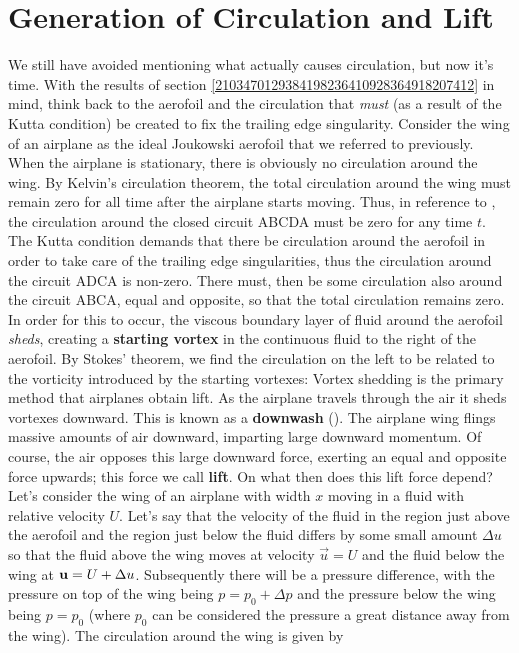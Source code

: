 \documentclass[12pt]{book}
\begin{document}
\section{Generation of Circulation and Lift}
We still have avoided mentioning what actually causes circulation, but now it's time.  With the results of section \ref{2103470129384198236410928364918207412} in mind, think back to the aerofoil and the circulation that \textit{must} (as a result of the Kutta condition) be created to fix the trailing edge singularity.  Consider the wing of an airplane as the ideal Joukowski aerofoil that we referred to previously.  When the airplane is stationary, there is obviously no circulation around the wing.  By Kelvin's circulation theorem, the total circulation around the wing must remain zero for all time after the airplane starts moving.  Thus, in reference to , the circulation around the closed circuit ABCDA must be zero for any time $t$.  The Kutta condition demands that there be circulation around the aerofoil in order to take care of the trailing edge singularities, thus the circulation around the circuit ADCA is non-zero.  There must, then be some circulation also around the circuit ABCA, equal and opposite, so that the total circulation remains zero.  In order for this to occur, the viscous boundary layer of fluid around the aerofoil \textit{sheds}, creating a \textbf{starting vortex} in the continuous fluid to the right of the aerofoil.  By Stokes' theorem, we find the circulation on the left to be related to the vorticity introduced by the starting vortexes:
Vortex shedding is the primary method that airplanes obtain lift.  As the airplane travels through the air it sheds vortexes downward. This is known as a \textbf{downwash} ().  The airplane wing flings massive amounts of air downward, imparting large downward momentum.  Of course, the air opposes this large downward force, exerting an equal and opposite force upwards; this force we call \textbf{lift}.  On what then does this lift force depend?  Let's consider the wing of an airplane with width $x$ moving in a fluid with relative velocity $U$.  Let's say that the velocity of the fluid in the region just above the aerofoil and the region just below the fluid differs by some small amount $\Delta u$ so that the fluid above the wing moves at velocity $\vec u=U$ and the fluid below the wing at $\mathbf{u}=U+\Delta u$.  Subsequently there will be a pressure difference, with the pressure on top of the wing being $p=p_0 + \Delta p$ and the pressure below the wing being $p=p_0$ (where $p_0$ can be considered the pressure a great distance away from the wing).  The circulation around the wing is given by
\end{document}
